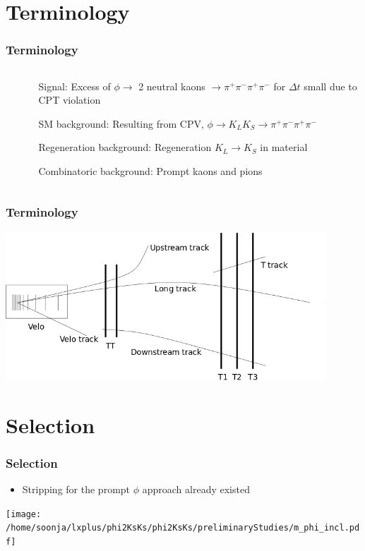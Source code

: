 \documentclass{beamer}
\begin{document}
\section{Terminology}
\begin{frame}
\frametitle{Terminology}
\begin{columns}
\begin{column}{.4\columnwidth}
$\frac{}{}$
\end{column}
\begin{column}{.6\columnwidth}
\begin{itemize}
\item[Signal: ] Excess of $\phi \rightarrow $ 2 neutral kaons $ \rightarrow \pi^+\pi^-\pi^+\pi^-$ for $\Delta t$ small due to CPT violation
\item[SM background: ] Resulting from CPV, $\phi \rightarrow K_L K_S \rightarrow \pi^+\pi^-\pi^+\pi^-$
\item[Regeneration background: ] Regeneration $K_L \rightarrow K_S$ in material\
\item[Combinatoric background: ] Prompt kaons and pions

\end{itemize}
\end{column}
\end{columns}






\end{frame}


\begin{frame}[fragile]
\frametitle{Terminology}

\begin{center}
\includegraphics[width = 0.9\textwidth]{tracktypes.png}
\end{center}
\end{frame}



\section{Selection}
\begin{frame}
\frametitle{Selection}

\begin{itemize}
\item Stripping for the prompt $\phi$ approach already existed
\end{itemize}

\centering
\texttt{[image: /home/soonja/lxplus/phi2KsKs/phi2KsKs/preliminaryStudies/m\_phi\_incl.pdf]}

\end{frame}
\end{document}
